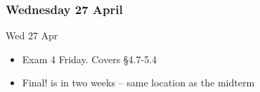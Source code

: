 \documentclass[cal1spr16Lectures.tex]{subfiles}
\begin{document}

\subsubsection{\bf Wednesday 27 April}

\begin{frame}[allowframebreaks]{Wed 27 Apr}
\begin{itemize}
\item Exam 4 Friday.  Covers \S 4.7-5.4
\item Final! is in two weeks  -- same location as the midterm
\end{itemize}
\end{frame}


\end{document}
